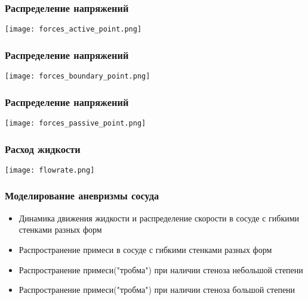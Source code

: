 \documentclass[14pt]{beamer}
\begin{document}
\begin{frame}
\frametitle{Распределение напряжений}
    \begin{center}
        \texttt{[image: forces\_active\_point.png]}
    \end{center}
\end{frame}

\begin{frame}
\frametitle{Распределение напряжений}
    \begin{center}
        \texttt{[image: forces\_boundary\_point.png]}
    \end{center}
\end{frame}

\begin{frame}
\frametitle{Распределение напряжений}
    \begin{center}
        \texttt{[image: forces\_passive\_point.png]}
    \end{center}
\end{frame}

\begin{frame}
\frametitle{Расход жидкости}
    \begin{center}
        \texttt{[image: flowrate.png]}
    \end{center}

\end{frame}

\begin{frame}
\frametitle{Моделирование аневризмы сосуда}
    \begin{itemize}
        \item[\MVRightarrow] Динамика движения жидкости и распределение скорости в сосуде с гибкими стенками разных форм
        \item[\MVRightarrow] Распространение примеси в сосуде с гибкими стенками разных форм
        \item[\MVRightarrow] Распространение примеси("тробма") при наличии стеноза небольшой степени
        \item[\MVRightarrow] Распространение примеси("тробма") при наличии стеноза большой степени
    \end{itemize}
\end{frame}
\end{document}
